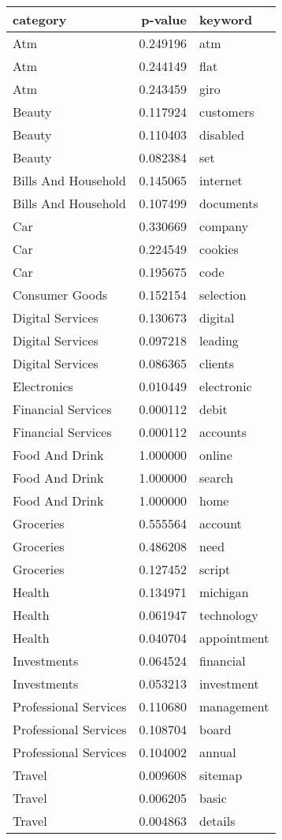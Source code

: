 \begin{tabular}{lrl}
\toprule
             category &  p-value &     keyword \\
\midrule
                  Atm & 0.249196 &         atm \\
                  Atm & 0.244149 &        flat \\
                  Atm & 0.243459 &        giro \\
               Beauty & 0.117924 &   customers \\
               Beauty & 0.110403 &    disabled \\
               Beauty & 0.082384 &         set \\
  Bills And Household & 0.145065 &    internet \\
  Bills And Household & 0.107499 &   documents \\
                  Car & 0.330669 &     company \\
                  Car & 0.224549 &     cookies \\
                  Car & 0.195675 &        code \\
       Consumer Goods & 0.152154 &   selection \\
     Digital Services & 0.130673 &     digital \\
     Digital Services & 0.097218 &     leading \\
     Digital Services & 0.086365 &     clients \\
          Electronics & 0.010449 &  electronic \\
   Financial Services & 0.000112 &       debit \\
   Financial Services & 0.000112 &    accounts \\
       Food And Drink & 1.000000 &      online \\
       Food And Drink & 1.000000 &      search \\
       Food And Drink & 1.000000 &        home \\
            Groceries & 0.555564 &     account \\
            Groceries & 0.486208 &        need \\
            Groceries & 0.127452 &      script \\
               Health & 0.134971 &    michigan \\
               Health & 0.061947 &  technology \\
               Health & 0.040704 & appointment \\
          Investments & 0.064524 &   financial \\
          Investments & 0.053213 &  investment \\
Professional Services & 0.110680 &  management \\
Professional Services & 0.108704 &       board \\
Professional Services & 0.104002 &      annual \\
               Travel & 0.009608 &     sitemap \\
               Travel & 0.006205 &       basic \\
               Travel & 0.004863 &     details \\
\bottomrule
\end{tabular}
